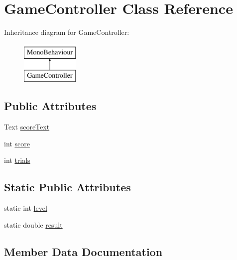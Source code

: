 \hypertarget{classGameController}{}\section{Game\+Controller Class Reference}
\label{classGameController}
Inheritance diagram for Game\+Controller\+:\begin{figure}[H]
\begin{center}
\leavevmode
\includegraphics[height=2.000000cm]{classGameController}
\end{center}
\end{figure}
\subsection*{Public Attributes}
\begin{DoxyCompactItemize}
\item 
Text \hyperlink{classGameController_ad59d43bc8b212847eaae1e877d8c1a31}{score\+Text}
\item 
int \hyperlink{classGameController_a5262f16a935aa930f813ff9c0dc060f2}{score}
\item 
int \hyperlink{classGameController_aaecabf498de08eaf6f9dd5d558977b05}{trials}
\end{DoxyCompactItemize}
\subsection*{Static Public Attributes}
\begin{DoxyCompactItemize}
\item 
static int \hyperlink{classGameController_a7cd8653884475571dc8328a469f113fc}{level}
\item 
static double \hyperlink{classGameController_abdb798d0c4696bac9dc7aee5068937e2}{result}
\end{DoxyCompactItemize}


\subsection{Member Data Documentation}
\mbox{\label{classGameController_a7cd8653884475571dc8328a469f113fc}} 
